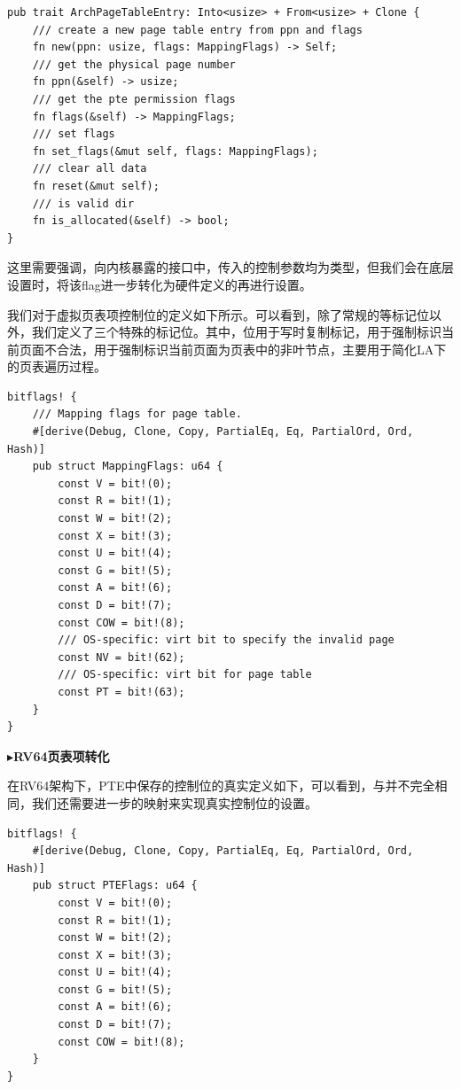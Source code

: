 \documentclass{article}
\begin{document}
\begin{lstlisting}
pub trait ArchPageTableEntry: Into<usize> + From<usize> + Clone {
    /// create a new page table entry from ppn and flags
    fn new(ppn: usize, flags: MappingFlags) -> Self;
    /// get the physical page number
    fn ppn(&self) -> usize;
    /// get the pte permission flags
    fn flags(&self) -> MappingFlags;
    /// set flags
    fn set_flags(&mut self, flags: MappingFlags);
    /// clear all data
    fn reset(&mut self);
    /// is valid dir
    fn is_allocated(&self) -> bool;
}
\end{lstlisting}

这里需要强调，向内核暴露的接口中，传入的控制参数均为类型，但我们会在底层设置时，将该flag进一步转化为硬件定义的再进行设置。

我们对于虚拟页表项控制位的定义如下所示。可以看到，除了常规的等标记位以外，我们定义了三个特殊的标记位。其中，位用于写时复制标记，用于强制标识当前页面不合法，用于强制标识当前页面为页表中的非叶节点，主要用于简化LA下的页表遍历过程。

\begin{lstlisting}
bitflags! {
    /// Mapping flags for page table.
    #[derive(Debug, Clone, Copy, PartialEq, Eq, PartialOrd, Ord, Hash)]
    pub struct MappingFlags: u64 {
        const V = bit!(0);
        const R = bit!(1);
        const W = bit!(2);
        const X = bit!(3);
        const U = bit!(4);
        const G = bit!(5);
        const A = bit!(6);
        const D = bit!(7);
        const COW = bit!(8);
        /// OS-specific: virt bit to specify the invalid page
        const NV = bit!(62);
        /// OS-specific: virt bit for page table
        const PT = bit!(63);
    }
}
\end{lstlisting}

$\blacktriangleright$\textbf{RV64页表项转化}

在RV64架构下，PTE中保存的控制位的真实定义如下，可以看到，与并不完全相同，我们还需要进一步的映射来实现真实控制位的设置。

\begin{lstlisting}
bitflags! {
    #[derive(Debug, Clone, Copy, PartialEq, Eq, PartialOrd, Ord, Hash)]
    pub struct PTEFlags: u64 {
        const V = bit!(0);
        const R = bit!(1);
        const W = bit!(2);
        const X = bit!(3);
        const U = bit!(4);
        const G = bit!(5);
        const A = bit!(6);
        const D = bit!(7);
        const COW = bit!(8);
    }
}
\end{lstlisting}
\end{document}
